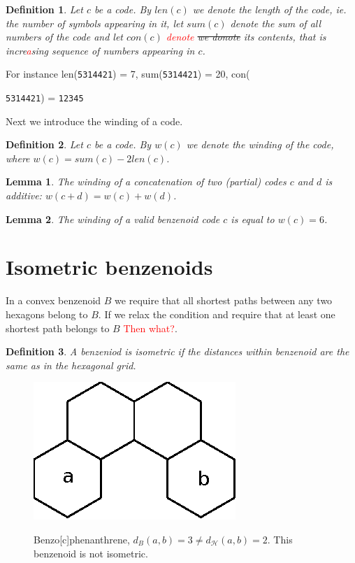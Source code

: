 \documentclass[a4paper,10pt]{article}
\newcounter{theorem}
\newtheorem{definition}{Definition}[section]
\newtheorem{lemma}{Lemma}[theorem]
\newcommand\TODO[1]{\textcolor{red}{#1}}
\newcommand\Tomo[1]{\textcolor{brown}{Tomo: #1}}
\begin{document}
\begin{definition}
Let $c$ be a code. By $len(c)$ we denote the length of the code, ie. the number of symbols appearing in it, let $sum(c)$ denote the sum of all numbers of the code and let $con(c)$ \TODO{denote} \sout{we donote} its \emph{contents}, that is incre\TODO{a}sing sequence of numbers appearing in $c$.
\end{definition}
For instance len({\tt 5314421}) = 7, sum({\tt 5314421}) = 20, con({{\tt 5314421}) = {\tt 12345}

Next we introduce the winding of a code.
\begin{definition}
Let $c$ be a code. By $w(c)$ we denote the winding of the code, where $w(c) = sum(c)-2len(c)$.
\end{definition}

\begin{lemma}
The winding of a concatenation of two (partial) codes $c$  and $d$ is additive: $w(c+d) = w(c)+w(d)$. 
\end{lemma}

\begin{lemma}
The winding of a valid benzenoid code $c$ is equal to $w(c) = 6$. 
\end{lemma}



\section{Isometric benzenoids}

In a convex benzenoid $B$ we require that all shortest paths between any two hexagons belong to $B$. If we relax the condition and require that at least one shortest path belongs to $B$ \TODO{Then what?}.

\begin{definition}
\label{def:isometric}
A benzeniod is isometric if the distances within benzenoid are the same as in the hexagonal grid.
\end{definition}



\begin{figure}
\centering
 \includegraphics{figures/fig2}
 \label{fig2}
 \caption{Benzo[c]phenanthrene, $d_B(a, b) = 3 \neq d_{\mathcal{H}}(a, b) = 2$. This benzenoid is not isometric.}
\end{figure}

}
\end{document}
